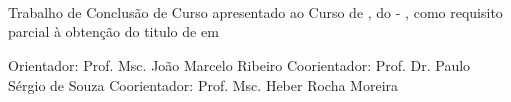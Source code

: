 %
%
\makeatletter
\begin{folhaderosto}
    \thispagestyle{empty}
    
    \begin{center}
		\large\textbf{\expandafter\uppercase\expandafter{\imprimirnomeautor}}{}
		\large\textbf{\expandafter\uppercase\expandafter{\imprimirsobrenomeautor}}\\
		\vspace*{5.0 cm}
		\normalsize\textbf{\expandafter\uppercase\expandafter{\imprimirtitulotb}}\\
		\text{\expandafter\expandafter{\imprimirsubtitulo}}\\
		
    \end{center}
	
	\vspace*{4.0 cm}
    \large
	\hfill
	\begin{minipage}{8 cm}
		\begin{small}
		\setlength{\baselineskip}{0.7\baselineskip}
    	Trabalho de Conclusão de Curso apresentado ao Curso de {\imprimirprograma}, do {\imprimirinstituicao} - 
    	{\imprimirdepartamento}, como requisito parcial à obtenção do titulo de {\imprimirgrau} em {\imprimirprograma}
    	
    	\vspace*{0.6 cm}
    	Orientador: Prof. Msc. João Marcelo Ribeiro
    	\newline
    	Coorientador: Prof. Dr. Paulo Sérgio de Souza
    	\newline
    	Coorientador: Prof. Msc. Heber Rocha Moreira
    	
		\end{small}
    \end{minipage}
    
    \begin{center}
        \vspace*{\fill}
        \small\textbf{\expandafter\uppercase\expandafter{\imprimirlocal}}\\
	    \small\textbf{\expandafter\uppercase\expandafter{\imprimirdata}}\\
    \end{center}
    
\end{folhaderosto}
\makeatother